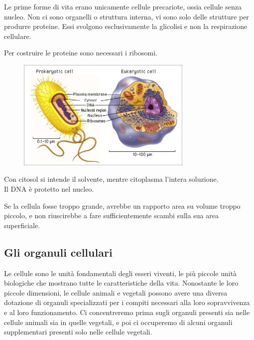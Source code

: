 \documentclass[a4paper]{article}
\begin{document}
Le prime forme di vita erano unicamente cellule precariote, ossia cellule 
senza nucleo. Non ci sono organelli o struttura interna, vi sono solo delle strutture
per produrre proteine.
Essi svolgono esclusivamente la glicolisi e non la respirazione cellulare.

Per costruire le proteine sono necessari i ribosomi.

\begin{figure}[th]
    \centering
    \includegraphics[width=0.75\textwidth]{./prok-euka.png}
\end{figure}

Con citosol si intende il solvente, mentre citoplasma l'intera soluzione.
\\
Il DNA è protetto nel nucleo.

Se la cellula fosse troppo grande, avrebbe un rapporto area su volume troppo piccolo, e non riuscirebbe
a fare sufficientemente scambi sulla sua area superficiale.

\subsection{Gli organuli cellulari}

Le cellule sono le unità fondamentali degli esseri viventi, le più piccole unità biologiche che
mostrano tutte le caratteristiche della vita. Nonostante le loro piccole dimensioni, le cellule
animali e vegetali possono avere una diversa dotazione di organuli specializzati per i compiti
necessari alla loro sopravvivenza e al loro funzionamento. Ci concentreremo prima sugli
organuli presenti sia nelle cellule animali sia in quelle vegetali, e poi ci occuperemo di alcuni
organuli supplementari presenti solo nelle cellule vegetali.
\end{document}
